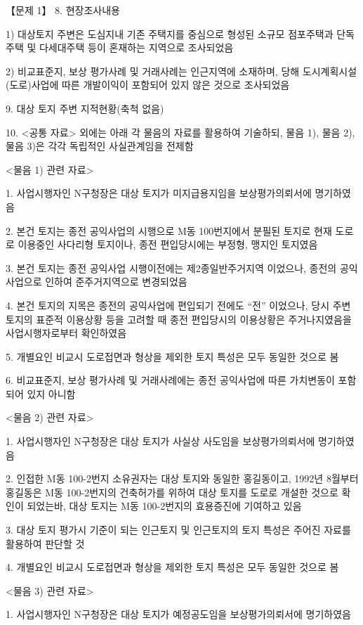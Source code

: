 \begin{longquestion}{【문제 1】}
8. 현장조사내용 \par
1) 대상토지 주변은 도심지내 기존 주택지를 중심으로 형성된 소규모 점포주택과 단독주택 및 다세대주택 등이 혼재하는 지역으로 조사되었음 \par
2) 비교표준지, 보상 평가사례 및 거래사례는 인근지역에 소재하며, 당해 도시계획시설(도로)사업에 따른 개발이익이 포함되어 있지 않은 것으로 조사되었음 \par
9. 대상 토지 주변 지적현황(축척 없음) \par
{}
10. <공통 자료> 외에는 아래 각 물음의 자료를 활용하여 기술하되, 물음 1), 물음 2), 물음 3)은 각각 독립적인 사실관계임을 전제함 \par
<물음 1) 관련 자료> \par
1. 사업시행자인 N구청장은 대상 토지가 미지급용지임을 보상평가의뢰서에 명기하였음 \par
2. 본건 토지는 종전 공익사업의 시행으로 M동 100번지에서 분필된 토지로 현재 도로로 이용중인 사다리형 토지이나, 종전 편입당시에는 부정형, 맹지인 토지였음 \par
3. 본건 토지는 종전 공익사업 시행이전에는 제2종일반주거지역 이었으나, 종전의 공익사업으로 인하여 준주거지역으로 변경되었음 \par
4. 본건 토지의 지목은 종전의 공익사업에 편입되기 전에도 “전” 이었으나, 당시 주변 토지의 표준적 이용상황 등을 고려할 때 종전 편입당시의 이용상황은 주거나지였음을 사업시행자로부터 확인하였음 \par
5. 개별요인 비교시 도로접면과 형상을 제외한 토지 특성은 모두 동일한 것으로 봄 \par
6. 비교표준지, 보상 평가사례 및 거래사례에는 종전 공익사업에 따른 가치변동이 포함되어 있지 아니함 \par
<물음 2) 관련 자료> \par
1. 사업시행자인 N구청장은 대상 토지가 사실상 사도임을 보상평가의뢰서에 명기하였음 \par
2. 인접한 M동 100-2번지 소유권자는 대상 토지와 동일한 홍길동이고, 1992년 8월부터 홍길동은 M동 100-2번지의 건축허가를 위하여 대상 토지를 도로로 개설한 것으로 확인이 되었는바, 대상 토지는 M동 100-2번지의 효용증진에 기여하고 있음 \par
3. 대상 토지 평가시 기준이 되는 인근토지 및 인근토지의 토지 특성은 주어진 자료를 활용하여 판단할 것 \par
4. 개별요인 비교시 도로접면과 형상을 제외한 토지 특성은 모두 동일한 것으로 봄 \par
<물음 3) 관련 자료> \par
1. 사업시행자인 N구청장은 대상 토지가 예정공도임을 보상평가의뢰서에 명기하였음 \par

\end{longquestion}
